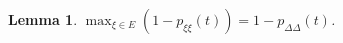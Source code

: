 \documentclass{article}
\newtheorem{lemma}{Lemma}
\newcommand{\1}[1]{\mathbbm{1}_{#1}}
\begin{document}
\begin{lemma}\label{thm:maximum_pr}
$\max_{\xi\in E} (1 - p_{\xi\xi}(t)) = 1 - p_{\Delta\Delta}(t)$.
\end{lemma}
\end{document}
